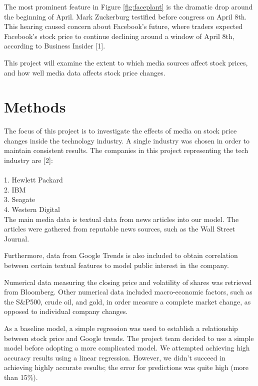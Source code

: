 \documentclass{article}
\begin{document}
The most prominent feature in Figure \ref{fig:faceplant} is the dramatic drop around the beginning of April. Mark Zuckerburg testified before congress on April 8th. This hearing caused concern about Facebook's future, where traders expected Facebook's stock price to continue declining around a window of April 8th, according to Business Insider [1].

This project will examine the extent to which media sources affect stock prices, and how well media data affects stock price changes.

\newpage 

\section{Methods}

The focus of this project is to investigate the effects of media on stock price changes inside the technology industry. A single industry was chosen in order to maintain consistent results. The companies in this project representing the tech industry are [2]: \\
\\
1. Hewlett Packard \\
2. IBM \\
3. Seagate \\
4. Western Digital \\

The main media data is textual data from news articles into our model. The articles were gathered from reputable news sources, such as the Wall Street Journal. 

Furthermore, data from Google Trends is also included to obtain correlation between certain textual features to model public interest in the company.  

Numerical data measuring the closing price and volatility of shares was retrieved from Bloomberg. Other numerical data included macro-economic factors, such as the S\&P500, crude oil, and gold, in order measure a complete market change, as opposed to individual company changes. 

As a baseline model, a simple regression was used to establish a relationship between stock price and Google trends. The project team decided to use a simple model before adopting a more complicated model. We attempted achieving high accuracy results using a linear regression. However, we didn’t succeed in achieving highly accurate results; the error for predictions was quite high (more than 15\%). 
\end{document}
